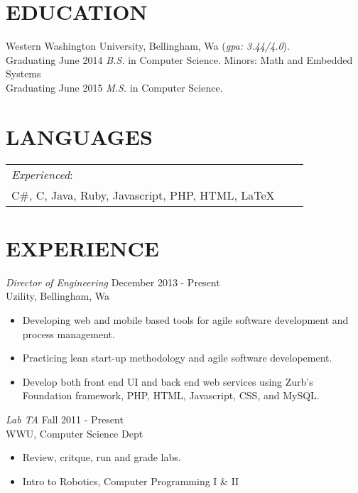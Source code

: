 \documentclass[line,margin]{res}
\begin{document}
\address{23714 NE 61st Street, Redmond, Wa, 98053}
\address{(425) 241-7977 \hspace{13mm} kyle.rader@ieee.org}
 
\begin{resume}
 
\section{EDUCATION}   Western Washington University, Bellingham, Wa ({\sl gpa: 3.44/4.0}).\\
			      Graduating June 2014 {\sl B.S.} in Computer Science. Minors: Math and Embedded Systems\\
			      Graduating June 2015 {\sl M.S.} in Computer Science.
			      
  
\section{LANGUAGES}
	\begin{table}[h]
		\begin{tabular}{ l l l }
			{\sl Experienced}: \\
			C\#, C, Java, Ruby, Javascript, PHP, HTML, {\LaTeX}
					
		\end{tabular}
 	\end{table}

\section{EXPERIENCE}

		{\sl Director of Engineering} \hfill December 2013 - Present \\
                	Uzility, Bellingham, Wa
               	 \begin{itemize}  \itemsep -2pt
                		\item Developing web and mobile based tools for agile software development and process management.  
                		\item Practicing lean start-up methodology and agile software developement. 
                		\item Develop both front end UI and back end web services using Zurb's Foundation framework, PHP, HTML, Javascript, CSS, and MySQL.  
                	\end{itemize}

                	{\sl Lab TA} \hfill        Fall 2011 - Present \\
                	WWU, Computer Science Dept
                  	\begin{itemize} \itemsep -2pt
                   		\item Review, critque,  run and grade labs.
			\item Intro to Robotics, Computer Programming I \& II
                   	\end{itemize}


\end{resume}
\end{document}
